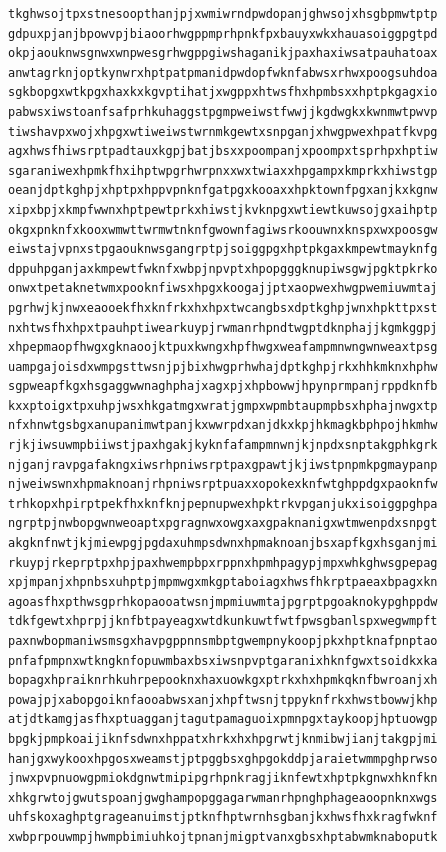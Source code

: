 \documentclass[11pt,letterpaper]{exam}
\begin{document}
\begin{questions}
\begin{verbatim}
tkghwsojtpxstnesoopthanjpjxwmiwrndpwdopanjghwsojxhsgbpmwtptp
gdpuxpjanjbpowvpjbiaoorhwgppmprhpnkfpxbauyxwkxhauasoiggpgtpd
okpjaouknwsgnwxwnpwesgrhwgppgiwshaganikjpaxhaxiwsatpauhatoax
anwtagrknjoptkynwrxhptpatpmanidpwdopfwknfabwsxrhwxpoogsuhdoa
sgkbopgxwtkpgxhaxkxkgvptihatjxwgppxhtwsfhxhpmbsxxhptpkgagxio
pabwsxiwstoanfsafprhkuhaggstpgmpweiwstfwwjjkgdwgkxkwnmwtpwvp
tiwshavpxwojxhpgxwtiweiwstwrnmkgewtxsnpganjxhwgpwexhpatfkvpg
agxhwsfhiwsrptpadtauxkgpjbatjbsxxpoompanjxpoompxtsprhpxhptiw
sgaraniwexhpmkfhxihptwpgrhwrpnxxwxtwiaxxhpgampxkmprkxhiwstgp
oeanjdptkghpjxhptpxhppvpnknfgatpgxkooaxxhpktownfpgxanjkxkgnw
xipxbpjxkmpfwwnxhptpewtprkxhiwstjkvknpgxwtiewtkuwsojgxaihptp
okgxpnknfxkooxwmwttwrmwtnknfgwownfagiwsrkoouwnxknspxwxpoosgw
eiwstajvpnxstpgaouknwsgangrptpjsoiggpgxhptpkgaxkmpewtmayknfg
dppuhpganjaxkmpewtfwknfxwbpjnpvptxhpopgggknupiwsgwjpgktpkrko
onwxtpetaknetwmxpooknfiwsxhpgxkoogajjptxaopwexhwgpwemiuwmtaj
pgrhwjkjnwxeaooekfhxknfrkxhxhpxtwcangbsxdptkghpjwnxhpkttpxst
nxhtwsfhxhpxtpauhptiwearkuypjrwmanrhpndtwgptdknphajjkgmkggpj
xhpepmaopfhwgxgknaoojktpuxkwngxhpfhwgxweafampmnwngwnweaxtpsg
uampgajoisdxwmpgsttwsnjpjbixhwgprhwhajdptkghpjrkxhhkmknxhphw
sgpweapfkgxhsgaggwwnaghphajxagxpjxhpbowwjhpynprmpanjrppdknfb
kxxptoigxtpxuhpjwsxhkgatmgxwratjgmpxwpmbtaupmpbsxhphajnwgxtp
nfxhnwtgsbgxanupanimwtpanjkxwwrpdxanjdkxkpjhkmagkbphpojhkmhw
rjkjiwsuwmpbiiwstjpaxhgakjkyknfafampmnwnjkjnpdxsnptakgphkgrk
njganjravpgafakngxiwsrhpniwsrptpaxgpawtjkjiwstpnpmkpgmaypanp
njweiwswnxhpmaknoanjrhpniwsrptpuaxxopokexknfwtghppdgxpaoknfw
trhkopxhpirptpekfhxknfknjpepnupwexhpktrkvpganjukxisoiggpghpa
ngrptpjnwbopgwnweoaptxpgragnwxowgxaxgpaknanigxwtmwenpdxsnpgt
akgknfnwtjkjmiewpgjpgdaxuhmpsdwnxhpmaknoanjbsxapfkgxhsganjmi
rkuypjrkeprptpxhpjpaxhwempbpxrppnxhpmhpagypjmpxwhkghwsgpepag
xpjmpanjxhpnbsxuhptpjmpmwgxmkgptaboiagxhwsfhkrptpaeaxbpagxkn
agoasfhxpthwsgprhkopaooatwsnjmpmiuwmtajpgrptpgoaknokypghppdw
tdkfgewtxhprpjjknfbtpayeagxwtdkunkuwtfwtfpwsgbanlspxwegwmpft
paxnwbopmaniwsmsgxhavpgppnnsmbptgwempnykoopjpkxhptknafpnptao
pnfafpmpnxwtkngknfopuwmbaxbsxiwsnpvptgaranixhknfgwxtsoidkxka
bopagxhpraiknrhkuhrpepooknxhaxuowkgxptrkxhxhpmkqknfbwroanjxh
powajpjxabopgoiknfaooabwsxanjxhpftwsnjtppyknfrkxhwstbowwjkhp
atjdtkamgjasfhxptuagganjtagutpamaguoixpmnpgxtaykoopjhptuowgp
bpgkjpmpkoaijiknfsdwnxhppatxhrkxhxhpgrwtjknmibwjianjtakgpjmi
hanjgxwykooxhpgosxweamstjptpggbsxghpgokddpjaraietwmmpghprwso
jnwxpvpnuowgpmiokdgnwtmipipgrhpnkragjiknfewtxhptpkgnwxhknfkn
xhkgrwtojgwutspoanjgwghampopggagarwmanrhpnghphageaoopnknxwgs
uhfskoxaghptgrageanuimstjptknfhptwrnhsgbanjkxhwsfhxkragfwknf
xwbprpouwmpjhwmpbimiuhkojtpnanjmigptvanxgbsxhptabwmknaboputk

\end{verbatim}
\end{questions}
\end{document}

